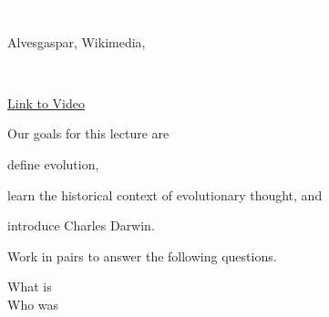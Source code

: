 \documentclass[t]{beamer}
\begin{document}
{
\begin{frame}[t,plain]
\end{frame}
}

{
\begin{frame}[b,plain]
	\hfill \tiny \textcolor{white}{Trey Ratcliff, Flickr, }
\end{frame}
}

{
\begin{frame}[b,plain]
\tiny Alvesgaspar, Wikimedia, 
\end{frame}
}

{
\begin{frame}[b,plain]
	\textcolor{white}{\tiny Les Williams, Flickr, }
\end{frame}
}

{
\begin{frame}[b,plain]
	\tiny\textcolor{white}{\href{http://www.youtube.com/watch?v=KIYkpwyKEhY}{Link to Video} \hfill \copyright\,Tim Laman, All Rights Reserved}
\end{frame}
}


\begin{frame}{Our goals for this lecture are}
	
	\hangpara define evolution, 
	
	\hangpara learn the historical context of evolutionary thought, and

	\hangpara introduce Charles Darwin.

\end{frame}

%

%
\begin{frame}[t,plain]{Work in pairs to answer the following questions.}
	\vspace{2ex}
	
	\hangpara What is  \onslide<2->\\[2\baselineskip]
	

	\onslide<1->\hangpara Who was 

\end{frame}
\end{document}
